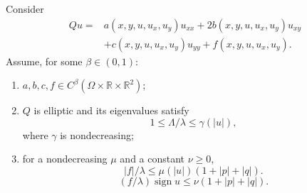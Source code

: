 Consider
\begin{equation}\tag{12.25}
\begin{aligned}
Qu={}&a(x,y,u,u_x,u_y)u_{xx}
+2b(x,y,u,u_x,u_y)u_{xy}\\
&+c(x,y,u,u_x,u_y)u_{yy}
+f(x,y,u,u_x,u_y).
\end{aligned}
\end{equation}
Assume, for some $\beta\in(0,1)$:
\begin{enumerate}
\item[(i)] $a,b,c,f\in
C^\beta(\Omega\times\mathbb R\times\mathbb R^2)$;
\item[(ii)] $Q$ is elliptic and its eigenvalues satisfy
\begin{equation}\tag{12.26}
1\le\Lambda/\lambda\le\gamma(|u|),
\end{equation}
where $\gamma$ is nondecreasing;
\item[(iii)] for a nondecreasing $\mu$ and a constant $\nu\ge0$,
\begin{equation}
|f|/\lambda\le\mu(|u|)(1+|p|+|q|).
\tag{12.27}
\end{equation}
\begin{equation}
(f/\lambda)\operatorname{sign}u
\le\nu(1+|p|+|q|).
\tag{12.28}
\end{equation}
\end{enumerate}

